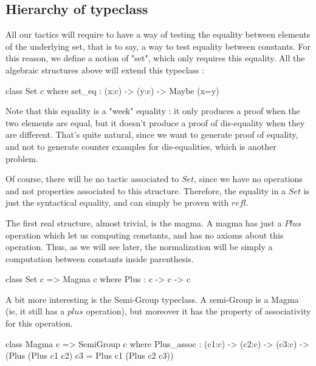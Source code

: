 \documentclass{sigplanconf}
\begin{document}
\subsection {Hierarchy of typeclass}

All our tactics will require to have a way of testing the equality between elements of the underlying set, that is to say, a way to test equality between constants. For this reason, we define a notion of "set", which only requires this equality. All the algebraic structures above will extend this typeclass :

\begin{code}[caption=Set, captionpos=b, label=lst1:haskell2]
class Set c where
    set_eq : (x:c) -> (y:c) -> Maybe (x=y)
\end{code}

Note that this equality is a "week" equality : it only produces a proof when the two elements are equal, but it doesn't produce a proof of dis-equality when they are different. That's quite natural, since we want to generate proof of equality, and not to generate counter examples for dis-equalities, which is another problem.

Of course, there will be no tactic associated to $Set$, since we have no operations and not properties associated to this structure. Therefore, the equality in a $Set$ is just the syntactical equality, and can simply be proven with $refl$.

The first real structure, almost trivial, is the magma. A magma has just a $Plus$ operation which let us computing constants, and has no axioms about this operation. Thus, as we will see later, the normalization will be simply a computation between constants inside parenthesis.

\begin{code}[caption=Magma, captionpos=b, label=lst1:haskell2]   
class Set c => Magma c where
    Plus : c -> c -> c
\end{code}

A bit more interesting is the Semi-Group typeclass. A semi-Group is a Magma (ie, it still has a $plus$ operation), but moreover it has the property of associativity for this operation.

\begin{code}[caption=Semi-Group, captionpos=b, label=lst1:haskell2]   
class Magma c => SemiGroup c where
    Plus_assoc : (c1:c) -> (c2:c) -> (c3:c) 
           -> (Plus (Plus c1 c2) c3 
                = Plus c1 (Plus c2 c3))
\end{code}
\end{document}
